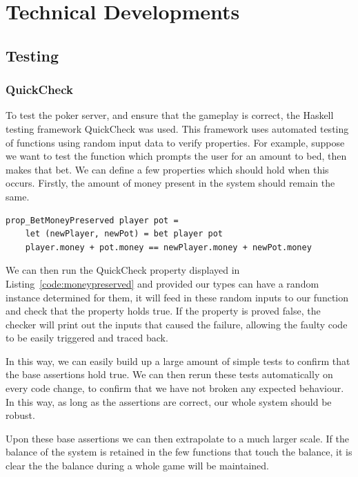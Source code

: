 \section{Technical Developments}

\subsection{Testing}

\subsubsection{QuickCheck}

To test the poker server, and ensure that the gameplay is correct, the
Haskell testing framework QuickCheck\parencite{claessen2000} was used. This
framework uses automated testing of functions using random input data to
verify properties. For example, suppose we want to test the function which
prompts the user for an amount to bed, then makes that bet. We can define a
few properties which should hold when this occurs.
Firstly, the amount of money present in the system should remain the same.

\begin{lstlisting}[label={code:moneypreserved}, caption=An example QuickCheck property]
prop_BetMoneyPreserved player pot =
    let (newPlayer, newPot) = bet player pot
    player.money + pot.money == newPlayer.money + newPot.money
\end{lstlisting}

We can then run the QuickCheck property displayed in Listing~\ref{code:moneypreserved}
and provided our types can have a random instance determined for them, it
will feed in these random inputs to our function and check that the property
holds true. If the property is proved false, the checker will print out the
inputs that caused the failure, allowing the faulty code to be easily triggered
and traced back.

In this way, we can easily build up a large amount of simple tests to confirm
that the base assertions hold true. We can then rerun these tests automatically
on every code change, to confirm that we have not broken any expected
behaviour. In this way, as long as the assertions are correct, our whole
system should be robust.

Upon these base assertions we can then extrapolate to a much larger scale.
If the balance of the system is retained in the few functions that touch
the balance, it is clear the the balance during a whole game will be maintained.

